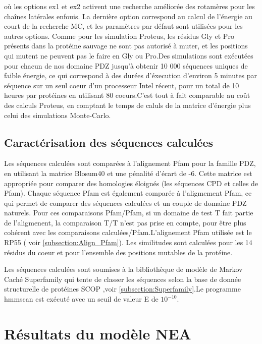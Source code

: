 où les options ex1 et ex2 activent une recherche améliorée des rotamères pour les chaînes latérales enfouis. La dernière option correspond au calcul de l'énergie au court de la recherche MC, et les paramètres par défaut sont utilisées pour les autres options.
Comme pour les simulation Proteus, les résidus Gly et Pro présents dans la protéine sauvage ne sont pas autorisé à muter, et les positions qui mutent ne peuvent pas le faire en Gly  ou Pro.Des simulations sont exécutées pour chacun de nos domaine PDZ jusqu'à obtenir 10 000 séquences uniques de faible énergie, ce qui correspond à des durées d'éxecution d'environ 5 minutes par séquence sur un seul coeur d'un processeur Intel récent, pour un total de 10 heures par protéines en utilisant 80 coeurs.C'est tout à fait comparable au coût des calculs Proteus, en comptant le temps de caluls de la matrice d'énergie plus celui des simulations Monte-Carlo.


\subsection{Caractérisation des séquences calculées}

Les séquences calculées sont comparées à l'alignement Pfam pour la famille PDZ, en utilisant la matrice Blosum40 et une pénalité d'écart de -6. Cette matrice est appropriée pour comparer des homologies éloignés (les séquences CPD et celles de Pfam). Chaque séquence Pfam est également comparée à l'aligmement Pfam, ce qui permet de comparer des séquences calculées et un couple de domaine PDZ naturels. Pour ces comparaisons Pfam/Pfam, si un domaine de test T fait partie de l'aligmenent, la comparaison T/T n'est pas prise en compte, pour être plus cohérent avec les comparaisons calculées/Pfam.L'alignement Pfam utilisée est le \og RP55 \fg ( voir \ref{subsection:Align_Pfam}). Les similitudes sont calculées pour les 14 résidus du coeur et pour l'ensemble des positions mutables de la protéine.

Les séquences calculées sont soumises à la bibliothèque de modèle de Markov Caché Superfamily \cite{Gough01,Wilson07}  qui tente de classer les séquences selon la base de donnée structurelle de protéines SCOP \cite{Andreeva04},voir \ref{subsection:Superfamily}.Le programme hmmscan est exécuté avec un seuil de valeur E de $10^{-10}$. 

\section {Résultats du modèle NEA}

